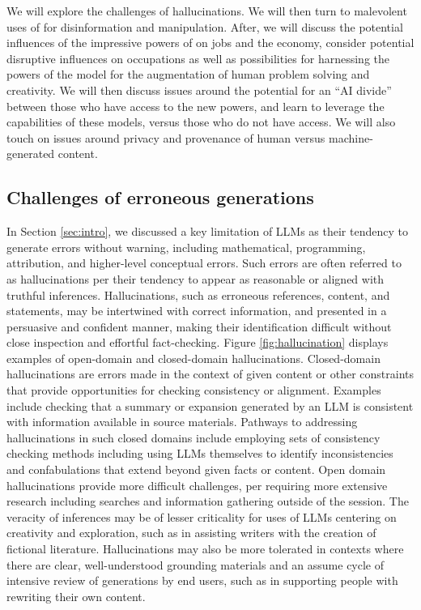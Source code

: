 We will explore the challenges of hallucinations. We will then turn to malevolent uses of {\DV} for disinformation and manipulation.  After, we will discuss the potential influences of the impressive powers of {\DV} on jobs and the economy, consider potential disruptive influences on occupations as well as possibilities for harnessing the powers of the model for the augmentation of human problem solving and creativity.  We will then discuss issues around the potential for an ``AI divide'' between those who have access to the new powers, and learn to leverage the capabilities of these models, versus those who do not have access. We will also touch on issues around privacy and provenance of human versus machine-generated content.

\subsection{Challenges of erroneous generations} 

In Section \ref{sec:intro}, we discussed a key limitation of LLMs as their tendency to generate errors without warning, including mathematical, programming, attribution, and higher-level conceptual errors. Such errors are often referred to as hallucinations per their tendency to appear as reasonable or aligned with truthful inferences. Hallucinations, such as erroneous references, content, and statements, may be intertwined with correct information, and presented in a persuasive and confident manner, making their identification difficult without close inspection and effortful fact-checking.  Figure \ref{fig:hallucination} displays examples of open-domain and closed-domain hallucinations. Closed-domain hallucinations are errors made in the context of given content or other constraints that provide opportunities for checking consistency or alignment. Examples include checking that a summary or expansion generated by an LLM is consistent with information available in source materials. Pathways to addressing hallucinations in such closed domains include employing sets of consistency checking methods including using LLMs themselves to identify inconsistencies and confabulations that extend beyond given facts or content. Open domain hallucinations provide more difficult challenges, per requiring more extensive research including searches and information gathering outside of the session. The veracity of inferences may be of lesser criticality for uses of LLMs centering on creativity and exploration, such as in assisting writers with the creation of fictional literature. Hallucinations may also be more tolerated in contexts where there are clear, well-understood grounding materials and an assume cycle of intensive review of generations by end users, such as in supporting people with rewriting their own content. 

